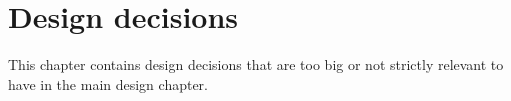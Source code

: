 \chapter{Design decisions}

This chapter contains design decisions that are too big or not strictly relevant
to have in the main design chapter.




